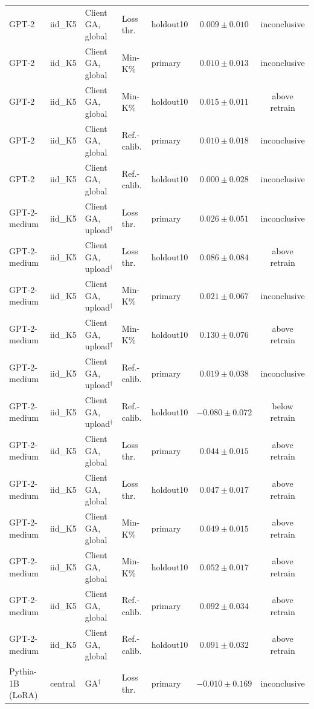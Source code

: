 {\begin{longtable}{@{\extracolsep{\fill}}lllllcc@{}}
GPT-2 & iid\_K5 & Client GA, global & Loss thr. & holdout10 & $0.009 \pm 0.010$ & inconclusive \\
GPT-2 & iid\_K5 & Client GA, global & Min-K\% & primary & $0.010 \pm 0.013$ & inconclusive \\
GPT-2 & iid\_K5 & Client GA, global & Min-K\% & holdout10 & $0.015 \pm 0.011$ & above retrain \\
GPT-2 & iid\_K5 & Client GA, global & Ref.-calib. & primary & $0.010 \pm 0.018$ & inconclusive \\
GPT-2 & iid\_K5 & Client GA, global & Ref.-calib. & holdout10 & $0.000 \pm 0.028$ & inconclusive \\
GPT-2-medium & iid\_K5 & Client GA, upload$^{\dagger}$ & Loss thr. & primary & $0.026 \pm 0.051$ & inconclusive \\
GPT-2-medium & iid\_K5 & Client GA, upload$^{\dagger}$ & Loss thr. & holdout10 & $0.086 \pm 0.084$ & above retrain \\
GPT-2-medium & iid\_K5 & Client GA, upload$^{\dagger}$ & Min-K\% & primary & $0.021 \pm 0.067$ & inconclusive \\
GPT-2-medium & iid\_K5 & Client GA, upload$^{\dagger}$ & Min-K\% & holdout10 & $0.130 \pm 0.076$ & above retrain \\
GPT-2-medium & iid\_K5 & Client GA, upload$^{\dagger}$ & Ref.-calib. & primary & $0.019 \pm 0.038$ & inconclusive \\
GPT-2-medium & iid\_K5 & Client GA, upload$^{\dagger}$ & Ref.-calib. & holdout10 & $-0.080 \pm 0.072$ & below retrain \\
GPT-2-medium & iid\_K5 & Client GA, global & Loss thr. & primary & $0.044 \pm 0.015$ & above retrain \\
GPT-2-medium & iid\_K5 & Client GA, global & Loss thr. & holdout10 & $0.047 \pm 0.017$ & above retrain \\
GPT-2-medium & iid\_K5 & Client GA, global & Min-K\% & primary & $0.049 \pm 0.015$ & above retrain \\
GPT-2-medium & iid\_K5 & Client GA, global & Min-K\% & holdout10 & $0.052 \pm 0.017$ & above retrain \\
GPT-2-medium & iid\_K5 & Client GA, global & Ref.-calib. & primary & $0.092 \pm 0.034$ & above retrain \\
GPT-2-medium & iid\_K5 & Client GA, global & Ref.-calib. & holdout10 & $0.091 \pm 0.032$ & above retrain \\
Pythia-1B (LoRA) & central & GA$^{\dagger}$ & Loss thr. & primary & $-0.010 \pm 0.169$ & inconclusive \\

\end{longtable}}
